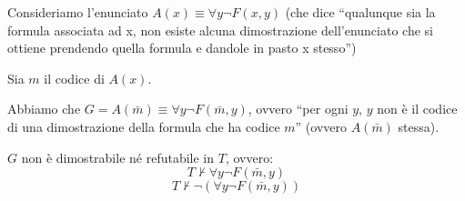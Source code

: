\documentclass[a4paper,11pt]{report}
\begin{document}
Consideriamo l'enunciato \( A(x)\equiv \forall y \neg F(x, y) \) (che dice ``qualunque sia la formula associata ad x, non esiste alcuna dimostrazione dell'enunciato che si ottiene prendendo quella formula e dandole in pasto x stesso'') 

Sia \( m \) il codice di \( A(x) \). 

Abbiamo che \( G = A(\bar{m}) \equiv \forall y \neg F(\bar{m}, y) \), ovvero ``per ogni \( y \), \( y \) non è il codice di una dimostrazione della formula che ha codice \( m \)'' (ovvero \( A(\bar{m}) \) stessa).

\begin{lemmaframe}{}{}
    \( G \) non è dimostrabile né refutabile in \( T \), ovvero:
    \[ T\not\vdash  \forall y \neg F(\bar{m}, y)  \]
    \[ T\not\vdash \neg(\forall y \neg F(\bar{m}, y)) \]
\end{lemmaframe}
\end{document}
